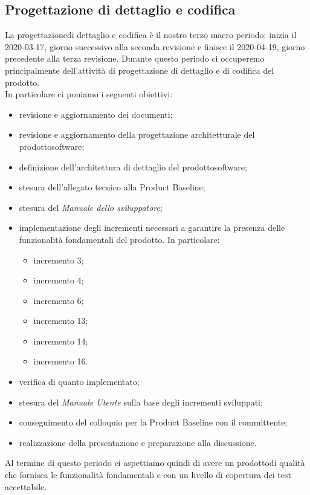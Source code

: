 \subsection{Progettazione di dettaglio e codifica}
La progettazione\glosp di dettaglio e codifica è il nostro terzo macro periodo: inizia il 2020-03-17, giorno successivo alla seconda revisione e finisce il 2020-04-19, giorno precedente alla terza revisione. Durante questo periodo ci occuperemo principalmente dell'attività di progettazione di dettaglio e di codifica del prodotto\glo. \\
In particolare ci poniamo i seguenti obiettivi:
\begin{itemize}
	\item revisione e aggiornamento dei documenti;
	\item revisione e aggiornamento della progettazione architetturale del prodotto\glosp software;
	\item definizione dell'architettura di dettaglio del prodotto\glosp software;
	\item stesura dell'allegato tecnico alla Product Baseline;
	\item stesura del \textit{Manuale dello sviluppatore};
	\item implementazione degli incrementi necessari a garantire la presenza delle funzionalità fondamentali del prodotto. In particolare:
		\begin{itemize}
		\item incremento 3;
		\item incremento 4;
		\item incremento 6;
		\item incremento 13;
		\item incremento 14;
		\item incremento 16.
		\end{itemize}
	\item verifica di quanto implementato;
	\item stesura del \textit{Manuale Utente} sulla base degli incrementi sviluppati;
	\item conseguimento del colloquio per la Product Baseline con il committente;
	\item realizzazione della presentazione e preparazione alla discussione.
\end{itemize}
Al termine di questo periodo ci aspettiamo quindi di avere un prodotto\glosp di qualità che fornisca le funzionalità fondamentali e con un livello di copertura dei test accettabile. 
